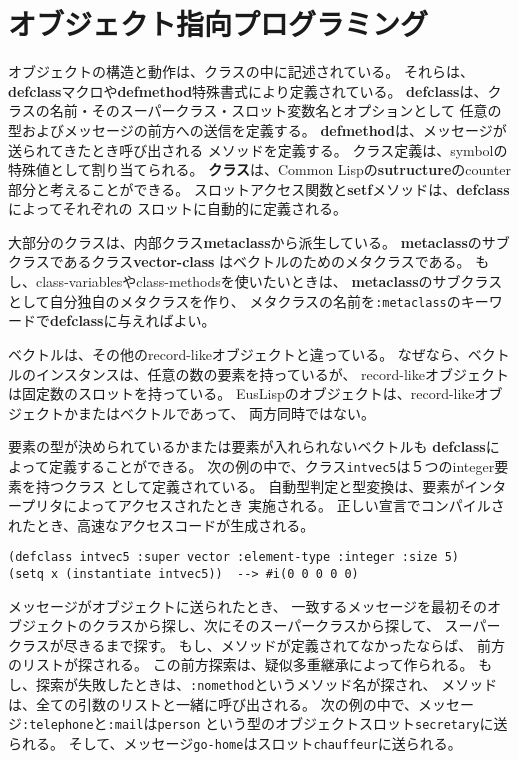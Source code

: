 \section{オブジェクト指向プログラミング}

オブジェクトの構造と動作は、クラスの中に記述されている。
それらは、{\bf defclass}マクロや{\bf defmethod}特殊書式により定義されている。
{\bf defclass}は、クラスの名前・そのスーパークラス・スロット変数名とオプションとして
任意の型およびメッセージの前方への送信を定義する。
{\bf defmethod}は、メッセージが送られてきたとき呼び出される
メソッドを定義する。
クラス定義は、symbolの特殊値として割り当てられる。
{\bf クラス}は、Common Lispの{\bf sutructure}のcounter部分と考えることができる。
スロットアクセス関数と{\bf setf}メソッドは、{\bf defclass}によってそれぞれの
スロットに自動的に定義される。

大部分のクラスは、内部クラス{\bf metaclass}から派生している。
{\bf metaclass}のサブクラスであるクラス{\bf vector-class}
はベクトルのためのメタクラスである。
もし、class-variablesやclass-methodsを使いたいときは、
{\bf metaclass}のサブクラスとして自分独自のメタクラスを作り、
メタクラスの名前を{\tt :metaclass}のキーワードで{\bf defclass}に与えればよい。

ベクトルは、その他のrecord-likeオブジェクトと違っている。
なぜなら、ベクトルのインスタンスは、任意の数の要素を持っているが、
record-likeオブジェクトは固定数のスロットを持っている。
EusLispのオブジェクトは、record-likeオブジェクトかまたはベクトルであって、
両方同時ではない。

要素の型が決められているかまたは要素が入れられないベクトルも
{\bf defclass}によって定義することができる。
次の例の中で、クラス{\tt intvec5}は５つのinteger要素を持つクラス
として定義されている。
自動型判定と型変換は、要素がインタープリタによってアクセスされたとき
実施される。
正しい宣言でコンパイルされたとき、高速なアクセスコードが生成される。

\begin{verbatim}
(defclass intvec5 :super vector :element-type :integer :size 5)
(setq x (instantiate intvec5))  --> #i(0 0 0 0 0)
\end{verbatim}

メッセージがオブジェクトに送られたとき、
一致するメッセージを最初そのオブジェクトのクラスから探し、次にそのスーパークラスから探して、
スーパークラスが尽きるまで探す。
もし、メソッドが定義されてなかったならば、
前方のリストが探される。
この前方探索は、疑似多重継承によって作られる。
もし、探索が失敗したときは、{\tt :nomethod}というメソッド名が探され、
メソッドは、全ての引数のリストと一緒に呼び出される。
次の例の中で、メッセージ{\tt :telephone}と{\tt :mail}は{\tt person}
という型のオブジェクトスロット{\tt secretary}に送られる。
そして、メッセージ{\tt go-home}はスロット{\tt chauffeur}に送られる。

